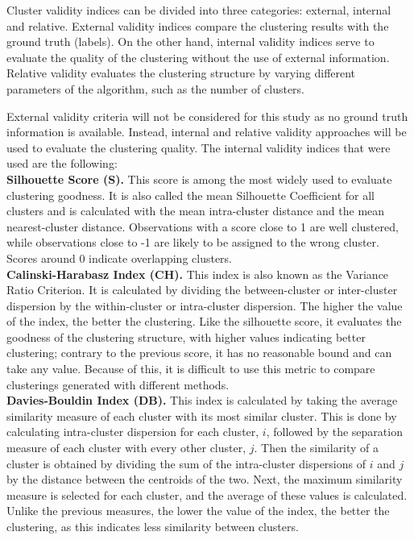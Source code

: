 Cluster validity indices can be divided into three categories: external, internal and relative. External validity indices compare the clustering results with the ground truth (labels). On the other hand, internal validity indices serve to evaluate the quality of the clustering without the use of external information. Relative validity evaluates the clustering structure by varying different parameters of the algorithm, such as the number of clusters.

External validity criteria will not be considered for this study as no ground truth information is available. Instead, internal and relative validity approaches will be used to evaluate the clustering quality. The internal validity indices that were used are the following:
\\

\noindent\textbf{Silhouette Score (S).} This score is among the most widely used to evaluate clustering goodness. It is also called the mean Silhouette Coefficient for all clusters and is calculated with the mean intra-cluster distance and the mean nearest-cluster distance. Observations with a score close to 1 are well clustered, while observations close to -1 are likely to be assigned to the wrong cluster. Scores around 0 indicate overlapping clusters.
\\

\noindent\textbf{Calinski-Harabasz Index (CH).} This index is also known as the Variance Ratio Criterion. It is calculated by dividing the between-cluster or inter-cluster dispersion by the within-cluster or intra-cluster dispersion. The higher the value of the index, the better the clustering. Like the silhouette score, it evaluates the goodness of the clustering structure, with higher values indicating better clustering; contrary to the previous score, it has no reasonable bound and can take any value. Because of this, it is difficult to use this metric to compare clusterings generated with different methods.
\\

\noindent\textbf{Davies-Bouldin Index (DB).} This index is calculated by taking the average similarity measure of each cluster with its most similar cluster. This is done by calculating intra-cluster dispersion for each cluster, $i$, followed by the separation measure of each cluster with every other cluster, $j$. Then the similarity of a cluster is obtained by dividing the sum of the intra-cluster dispersions of $i$ and $j$ by the distance between the centroids of the two. Next, the maximum similarity measure is selected for each cluster, and the average of these values is calculated. Unlike the previous measures, the lower the value of the index, the better the clustering, as this indicates less similarity between clusters.

